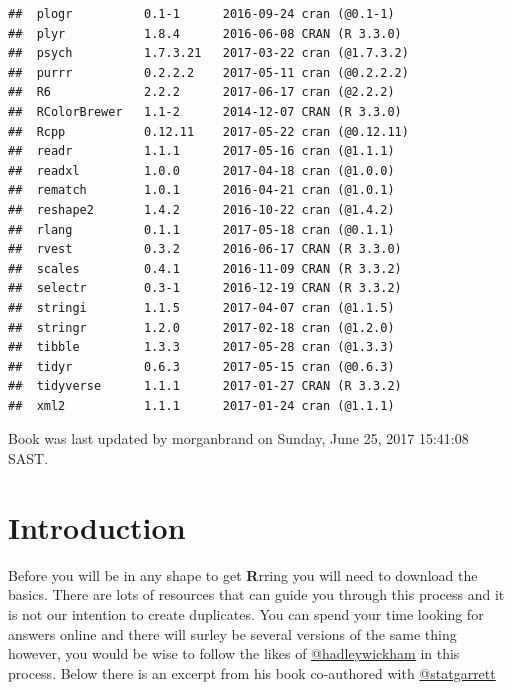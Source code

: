 \documentclass[]{book}
\theoremstyle{definition}
\theoremstyle{definition}
\theoremstyle{remark}
\begin{document}
\begin{verbatim}
##  plogr          0.1-1      2016-09-24 cran (@0.1-1)                     
##  plyr           1.8.4      2016-06-08 CRAN (R 3.3.0)                    
##  psych          1.7.3.21   2017-03-22 cran (@1.7.3.2)                   
##  purrr          0.2.2.2    2017-05-11 cran (@0.2.2.2)                   
##  R6             2.2.2      2017-06-17 cran (@2.2.2)                     
##  RColorBrewer   1.1-2      2014-12-07 CRAN (R 3.3.0)                    
##  Rcpp           0.12.11    2017-05-22 cran (@0.12.11)                   
##  readr          1.1.1      2017-05-16 cran (@1.1.1)                     
##  readxl         1.0.0      2017-04-18 cran (@1.0.0)                     
##  rematch        1.0.1      2016-04-21 cran (@1.0.1)                     
##  reshape2       1.4.2      2016-10-22 cran (@1.4.2)                     
##  rlang          0.1.1      2017-05-18 cran (@0.1.1)                     
##  rvest          0.3.2      2016-06-17 CRAN (R 3.3.0)                    
##  scales         0.4.1      2016-11-09 CRAN (R 3.3.2)                    
##  selectr        0.3-1      2016-12-19 CRAN (R 3.3.2)                    
##  stringi        1.1.5      2017-04-07 cran (@1.1.5)                     
##  stringr        1.2.0      2017-02-18 cran (@1.2.0)                     
##  tibble         1.3.3      2017-05-28 cran (@1.3.3)                     
##  tidyr          0.6.3      2017-05-15 cran (@0.6.3)                     
##  tidyverse      1.1.1      2017-01-27 CRAN (R 3.3.2)                    
##  xml2           1.1.1      2017-01-24 cran (@1.1.1)
\end{verbatim}

Book was last updated by morganbrand on Sunday, June 25, 2017 15:41:08
SAST.

\chapter{Introduction}\label{intro}

Before you will be in any shape to get \textbf{R}rring you will need to
download the basics. There are lots of resources that can guide you
through this process and it is not our intention to create duplicates.
You can spend your time looking for answers online and there will surley
be several versions of the same thing however, you would be wise to
follow the likes of
\href{https://twitter.com/hadleywickham}{@hadleywickham} in this
process. Below there is an excerpt from his book co-authored with
\href{https://twitter.com/statgarrett}{@statgarrett}
\end{document}

